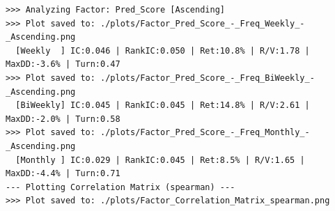 \documentclass[10pt,compsoc,UTF8]{CjC}
\begin{document}
\begin{lstlisting}
>>> Analyzing Factor: Pred_Score [Ascending]
>>> Plot saved to: ./plots/Factor_Pred_Score_-_Freq_Weekly_-_Ascending.png
  [Weekly  ] IC:0.046 | RankIC:0.050 | Ret:10.8% | R/V:1.78 | MaxDD:-3.6% | Turn:0.47
>>> Plot saved to: ./plots/Factor_Pred_Score_-_Freq_BiWeekly_-_Ascending.png
  [BiWeekly] IC:0.045 | RankIC:0.045 | Ret:14.8% | R/V:2.61 | MaxDD:-2.0% | Turn:0.58
>>> Plot saved to: ./plots/Factor_Pred_Score_-_Freq_Monthly_-_Ascending.png
  [Monthly ] IC:0.029 | RankIC:0.045 | Ret:8.5% | R/V:1.65 | MaxDD:-4.4% | Turn:0.71
--- Plotting Correlation Matrix (spearman) ---
>>> Plot saved to: ./plots/Factor_Correlation_Matrix_spearman.png
\end{lstlisting}

\clearpage
{}
\end{document}
